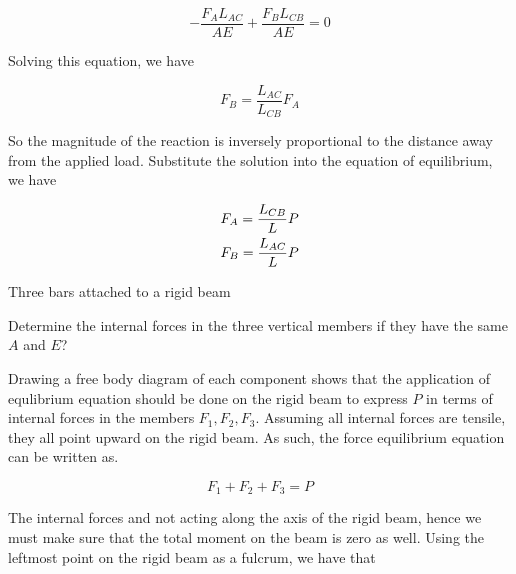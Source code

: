 \documentclass[
fontsize=10pt,
a4paper,
twosides=false,
open=any,
svgnames,
]{kaobook} %
\begin{document}
\begin{example}
\[ - \frac{{{F_A}{L_{AC}}}}{{AE}} + \frac{{{F_B}{L_{CB}}}}{{AE}} = 0\]

Solving this equation, we have

\[{F_B} = \frac{{{L_{AC}}}}{{{L_{CB}}}}{F_A}\]

So the magnitude of the reaction is inversely proportional to the distance away from the applied load. Substitute the solution into the equation of equilibrium, we have

\[\begin{gathered}
  {F_A} = \frac{{{L_{CB}}}}{L}P \hfill \\
  {F_B} = \frac{{{L_{AC}}}}{L}P \hfill \\ 
\end{gathered} \]
\end{example}

\begin{example} Three bars attached to a rigid beam
  \begin{figure}[H]
    \centering
  \end{figure}

  Determine the internal forces in the three vertical members if they have the same $A$ and $E$?

  Drawing a free body diagram of each component shows that the application of equlibrium equation should be done on the rigid beam to express $P$ in terms of internal forces in the members $F_1, F_2, F_3$. Assuming all internal forces are tensile, they all point upward on the rigid beam. As such, the force equilibrium equation can be written as.

 \[ F_1 + F_2 + F_3 = P \]

 The internal forces and not acting along the axis of the rigid beam, hence we must make sure that the total moment on the beam is zero as well. Using the leftmost point on the rigid beam as a fulcrum, we have that


\end{example}
\end{document}
